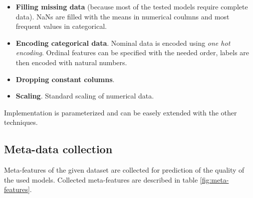 \documentclass[hidelinks, english]{mvi-report}
\begin{document}
\begin{itemize}
    \item \textbf{Filling missing data} (because most of the tested models require complete data). NaNs are filled with
    the means in numerical coulmns and most frequent values in categorical.
    \item \textbf{Encoding categorical data}. Nominal data is encoded using \textit{one hot encoding}. Ordinal features
    can be specified with the needed order, labels are then encoded with natural numbers.
    \item \textbf{Dropping constant columns}.
    \item \textbf{Scaling}. Standard scaling of numerical data.
\end{itemize}

Implementation is parameterized and can be easely extended with the other techniques.

\subsection{Meta-data collection}

Meta-features of the given dataset are collected for prediction of the quality of the used models. Collected
meta-features are described in table \ref{fig:meta-features}.
\end{document}
